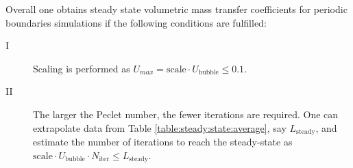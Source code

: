 \documentclass[preprint,12pt]{elsarticle}
\newcommand{\ububble}{U_{\mathrm{bubble}}}
\newcommand{\cstar}{C^{*}}
\begin{document}
Overall one obtains  steady state volumetric mass transfer coefficients for
periodic boundaries simulations if the following conditions are fulfilled:
\begin{description}
\item[I] Scaling is performed as $U_{max}=\mathrm{scale}\cdot\ububble\leq 0.1$.
\item[II] The larger the Peclet number, the fewer iterations are required. One can extrapolate data from Table
\ref{table:steady:state:average}, say $L_{\mathrm{steady}}$, and estimate the  number of
iterations to reach the steady-state as $\mathrm{scale}\cdot \ububble\cdot N_{\mathrm{iter}}\leq L_{\mathrm{steady}}$. 
\end{description}
\end{document}
